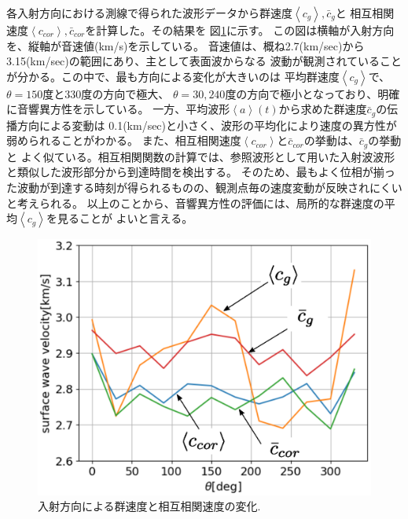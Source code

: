 各入射方向における測線で得られた波形データから群速度$\left<c_g\right>,\bar c_g$と
相互相関速度$\left<c_{cor}\right>, \bar c_{cor}$を計算した。その結果を
図\ref{fig:fig12}に示す。
この図は横軸が入射方向を、縦軸が音速値(km/s)を示している。
音速値は、概ね2.7(km/sec)から3.15(km/sec)の範囲にあり、主として表面波からなる
波動が観測されていることが分かる。この中で、最も方向による変化が大きいのは
平均群速度$\left<c_g\right>$で、$\theta=150$度と330度の方向で極大、
$\theta=30,240$度の方向で極小となっており、明確に音響異方性を示している。
一方、平均波形$\left<a \right>(t)$から求めた群速度$\bar c_g$の伝播方向による変動は
0.1(km/sec)と小さく、波形の平均化により速度の異方性が弱められることがわかる。
また、相互相関速度$\left<c_{cor}\right>$と$\bar{c}_{cor}$の挙動は、$\bar c_g$の挙動と
よく似ている。相互相関関数の計算では、参照波形として用いた入射波波形と類似した波形部分から到達時間を検出する。
そのため、最もよく位相が揃った波動が到達する時刻が得られるものの、観測点毎の速度変動が反映されにくいと考えられる。
以上のことから、音響異方性の評価には、局所的な群速度の平均$\left<c_g\right>$を見ることが
よいと言える。
\begin{figure}[h]
	\begin{center}
	\includegraphics[width=0.8\linewidth]{Figs/fig12.eps} 
	\end{center}
	\caption{
		入射方向による群速度と相互相関速度の変化.
	} 
	\label{fig:fig12}
\end{figure}

